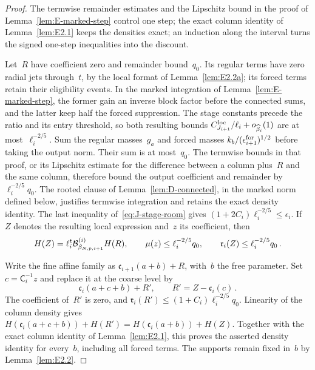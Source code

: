 \begin{proof}\label{proof:J-signed-start}
The termwise remainder estimates and the Lipschitz bound in the proof of Lemma~\ref{lem:E-marked-step} control one step; the exact column identity of Lemma~\ref{lem:E2.1} keeps the densities exact; an induction along the interval turns the signed one-step inequalities into the discount.

Let~$R$ have coefficient zero and remainder bound~$q_0$. Its regular terms have zero radial jets through~$t$, by the local format of Lemma~\ref{lem:E2.2a}; its forced terms retain their eligibility events. In the marked integration of Lemma~\ref{lem:E-marked-step}, the former gain an inverse block factor before the connected sums, and the latter keep half the forced suppression. The stage constants precede the ratio and its entry threshold, so both resulting bounds $C^{\rm loc}_{J_{i+1}}/\ell_i+o_{\widehat\beta_i}(1)$ are at most~$\ell_i^{-2/5}$. Sum the regular masses~$g_a$ and forced masses $k_b/(\epsilon_{i+1}^{\rm for})^{1/2}$ before taking the output norm. Their sum is at most~$q_0$. The termwise bounds in that proof, or its Lipschitz estimate for the difference between a column plus~$R$ and the same column, therefore bound the output coefficient and remainder by~$\ell_i^{-2/5}q_0$. The rooted clause of Lemma~\ref{lem:D-connected}, in the marked norm defined below, justifies termwise integration and retains the exact density identity. The last inequality of~\eqref{eq:J-stage-room} gives $(1+2C_i)\ell_i^{-2/5}\le\epsilon_i$. If~$Z$ denotes the resulting local expression and~$z$ its coefficient, then
\begin{equation*}
H(Z)=\ell_i^t\mathcal{B}^{(i)}_{\beta_{N,p,i+1}}H(R),\qquad
\mu(z)\le\ell_i^{-2/5}q_0,\qquad\mathfrak r_i(Z)\le\ell_i^{-2/5}q_0\,.
\end{equation*}

Write the fine affine family as $\mathfrak c_{i+1}(a+b)+R$, with~$b$ the free parameter. Set $c=\mathsf C_i^{-1}z$ and replace it at the coarse level by
\begin{equation*}
\mathfrak c_i(a+c+b)+R',\qquad
R'=Z-\mathfrak c_i(c)\,.
\end{equation*}
The coefficient of~$R'$ is zero, and $\mathfrak r_i(R')\le(1+C_i)\ell_i^{-2/5}q_0$.
Linearity of the column density gives
$H(\mathfrak c_i(a+c+b))+H(R')=H(\mathfrak c_i(a+b))+H(Z)$.
Together with the exact column identity of Lemma~\ref{lem:E2.1}, this proves the asserted density identity for every~$b$, including all forced terms. The supports remain fixed in~$b$ by Lemma~\ref{lem:E2.2}.


\end{proof}
